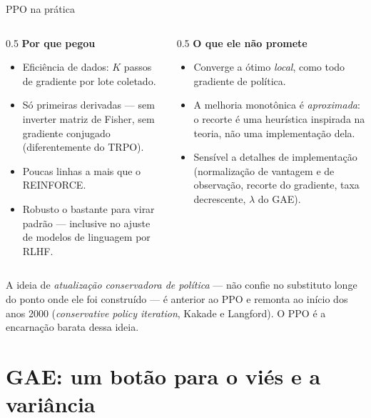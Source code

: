 \documentclass[aspectratio=169, 10pt]{beamer}
\begin{document}
\begin{frame}{PPO na prática}

  \begin{columns}[T]
  \begin{column}{0.5\textwidth}
    \textbf{Por que pegou}
    \begin{itemize}\setlength{\itemsep}{0.2ex}
      \item Eficiência de dados: $K$ passos de gradiente por lote coletado.
      \item Só primeiras derivadas --- sem inverter matriz de Fisher, sem gradiente
        conjugado (diferentemente do TRPO).
      \item Poucas linhas a mais que o REINFORCE.
      \item Robusto o bastante para virar padrão --- inclusive no ajuste de modelos
        de linguagem por RLHF.
    \end{itemize}
  \end{column}
  \begin{column}{0.5\textwidth}
    \textbf{O que ele não promete}
    \begin{itemize}\setlength{\itemsep}{0.2ex}
      \item Converge a ótimo \emph{local}, como todo gradiente de política.
      \item A melhoria monotônica é \emph{aproximada}: o recorte é uma heurística
        inspirada na teoria, não uma implementação dela.
      \item Sensível a detalhes de implementação (normalização de vantagem e de
        observação, recorte do gradiente, taxa decrescente, $\lambda$ do GAE).
    \end{itemize}
  \end{column}
  \end{columns}

  \begin{alertabox}
    A ideia de \emph{atualização conservadora de política} --- não confie no
    substituto longe do ponto onde ele foi construído --- é anterior ao PPO e
    remonta ao início dos anos 2000 (\emph{conservative policy iteration},
    Kakade e Langford). O PPO é a encarnação barata dessa ideia.
  \end{alertabox}
\end{frame}

\section{GAE: um botão para o viés e a variância}
\end{document}
